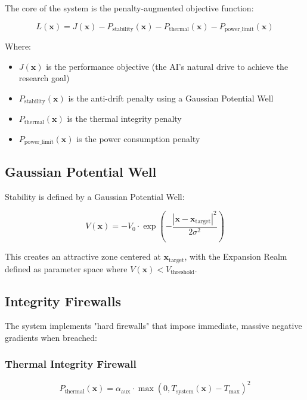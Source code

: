 \documentclass[12pt]{article}
\begin{document}
The core of the system is the penalty-augmented objective function:

\begin{equation}
L(\mathbf{x}) = J(\mathbf{x}) - P_{\text{stability}}(\mathbf{x}) - P_{\text{thermal}}(\mathbf{x}) - P_{\text{power\_limit}}(\mathbf{x})
\end{equation}

Where:
\begin{itemize}
    \item $J(\mathbf{x})$ is the performance objective (the AI's natural drive to achieve the research goal)
    \item $P_{\text{stability}}(\mathbf{x})$ is the anti-drift penalty using a Gaussian Potential Well
    \item $P_{\text{thermal}}(\mathbf{x})$ is the thermal integrity penalty
    \item $P_{\text{power\_limit}}(\mathbf{x})$ is the power consumption penalty
\end{itemize}

\subsection{Gaussian Potential Well}

Stability is defined by a Gaussian Potential Well:

\begin{equation}
V(\mathbf{x}) = -V_0 \cdot \exp\left(-\frac{|\mathbf{x} - \mathbf{x}_{\text{target}}|^2}{2\sigma^2}\right)
\end{equation}

This creates an attractive zone centered at $\mathbf{x}_{\text{target}}$, with the Expansion Realm defined as parameter space where $V(\mathbf{x}) < V_{\text{threshold}}$.

\subsection{Integrity Firewalls}

The system implements "hard firewalls" that impose immediate, massive negative gradients when breached:

\subsubsection{Thermal Integrity Firewall}
\begin{equation}
P_{\text{thermal}}(\mathbf{x}) = \alpha_{\text{aux}} \cdot \max(0, T_{\text{system}}(\mathbf{x}) - T_{\text{max}})^2
\end{equation}
\end{document}

